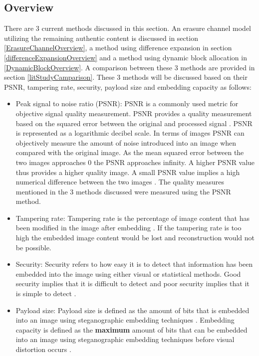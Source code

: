 \documentclass[12pt]{article}
\begin{document}
\subsection{Overview}
There are 3 current methods discussed in this section. An erasure channel model utilizing the remaining authentic content is discussed in section \ref{ErasureChannelOverview}, a method using difference expansion in section \ref{differenceExpansionOverview} and a method using dynamic block allocation in \ref{DynamicBlockOverview}. 
A comparison between these 3 methods are provided in section \ref{litStudyCamparison}.
These 3 methods will be discussed based on their PSNR, tampering rate, security, payload size and embedding capacity as follows:

\begin{itemize}
	\item Peak signal to noise ratio (PSNR): PSNR is a commonly used metric for objective signal quality measurement. PSNR provides a quality measurement based on the squared error between the original and processed signal \cite{turaga2004no}. PSNR is represented as a logarithmic decibel scale. In terms of images PSNR can objectively measure the amount of noise introduced into an image when compared with the original image. 
	As the mean squared error between the two images approaches 0 the PSNR approaches infinity. A higher PSNR value thus provides a higher quality image. 
	A small PSNR value implies a high numerical difference between the two images \cite{hore2010image}.  
	The quality measures mentioned in the 3 methods discussed were measured using the PSNR method. 
	\item Tampering rate: Tampering rate is the percentage of image content that has been modified in the image after embedding \cite{qian2011image}.
	If the tampering rate is too high the embedded image content would be lost and reconstruction would not be possible.
	\item Security: Security refers to how easy it is to detect that information has been embedded into the image using either visual or statistical methods. Good security implies that it is difficult to detect and poor security implies that it is simple to detect \cite{fridrich2009steganography}.
	\item Payload size: Payload size is defined as the amount of bits that is embedded into an image using steganographic embedding techniques \cite{chen2010high}. Embedding capacity is defined as the \textbf{maximum} amount of bits that can be embedded into an image using steganographic embedding techniques before visual distortion occurs \cite{chen2010high}.
\end{itemize}
\end{document}
